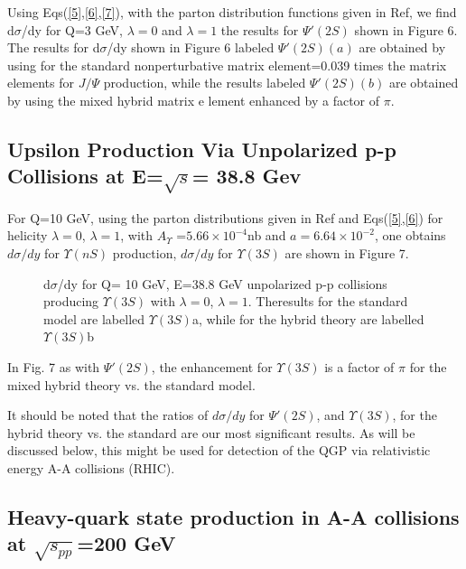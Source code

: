 \newpage

  Using Eqs(\ref{5},\ref{6},\ref{7}), with the parton distribution functions 
given in Ref\cite{klm11}, we find d$\sigma$/dy for Q=3 GeV, $\lambda=0$ and 
$\lambda=1$ the results for $\Psi'(2S)$  shown in Figure 6.
The results for d$\sigma$/dy shown in Figure 6 labeled $\Psi'(2S)(a)$ are
 obtained by using for the standard nonperturbative matrix element=0.039 
times the matrix elements for $J/\Psi$ production\cite{klm11}, while the 
results labeled  $\Psi'(2S)(b)$ are obtained by using the mixed hybrid matrix e
lement enhanced by a factor of $\pi$.

\subsection{Upsilon Production Via Unpolarized p-p
Collisions at E=$\sqrt{s}$= 38.8 Gev}

For Q=10 GeV, using the parton distributions given in Ref\cite{klm11} and 
Eqs(\ref{5},\ref{6}) for helicity $\lambda=0$, $\lambda=1$, with
$A_{\Upsilon}$ =$5.66 \times 10^{-4}$nb and $a=6.64 \times 10^{-2}$, one obtains 
$d\sigma/dy$ for $\Upsilon(nS)$ production, $d\sigma/dy$  for  
$\Upsilon(3S)$ are shown in Figure 7.
\vspace{6cm}

\begin{figure}[ht]
\begin{center}
\caption{d$\sigma$/dy for Q= 10 GeV, E=38.8 GeV unpolarized p-p collisions 
producing $\Upsilon(3S)$ with $\lambda=0$, $\lambda=1$. Theresults for the 
standard model are labelled $\Upsilon(3S)$a, while for the hybrid theory are 
labelled $\Upsilon(3S)$b}
\label{Figure 10}
\end{center}
\end{figure}

In Fig. 7 as with $\Psi'(2S)$, the enhancement for $\Upsilon(3S)$
is a factor of $\pi$ for the mixed hybrid theory vs. the standard
model.

 It should be noted that the ratios of $d\sigma/dy$ for $\Psi'(2S)$,
 and $\Upsilon(3S)$, for the hybrid theory vs. 
the standard are our most significant results. As will be discussed below,
this might be used for detection of the QGP via  relativistic energy A-A
collisions (RHIC).
\clearpage
\subsection{Heavy-quark state production in A-A collisions
 at $\sqrt{s_{pp}}$=200 GeV}

